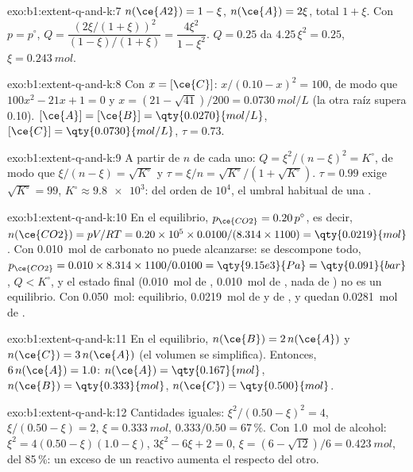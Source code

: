 \begin{solution}{exo:b1:extent-q-and-k:7}
$n(\ce{A2}) = 1 - \xi$, $n(\ce{A}) = 2\xi$, total $1 + \xi$. Con $p =
p^\circ$, $Q = \dfrac{(2\xi/(1+\xi))^2}{(1-\xi)/(1+\xi)} = \dfrac{4\xi^2}{1 -
\xi^2}$. $Q = 0.25$ da $4.25\,\xi^2 = 0.25$, $\xi = \qty{0.243}{mol}$.
\end{solution}

\begin{solution}{exo:b1:extent-q-and-k:8}
Con $x = [\ce{C}]$: $x/(0.10 - x)^2 = 100$, de modo que $100x^2 - 21x + 1 = 0$ y
$x = (21 - \sqrt{41})/200 = \qty{0.0730}{mol/L}$ (la otra raíz supera
0.10). $[\ce{A}] = [\ce{B}] = \qty{0.0270}{mol/L}$, $[\ce{C}] =
\qty{0.0730}{mol/L}$, $\tau = 0.73$.
\end{solution}

\begin{solution}{exo:b1:extent-q-and-k:9}
A partir de $n$ de cada uno: $Q = \xi^2/(n - \xi)^2 = K^\circ$, de modo que $\xi/(n - \xi) =
\sqrt{K^\circ}$ y $\tau = \xi/n = \sqrt{K^\circ}/(1 + \sqrt{K^\circ})$.
$\tau = 0.99$ exige $\sqrt{K^\circ} = 99$, $K^\circ \approx \num{9.8e3}$:
del orden de $10^4$, el umbral habitual de una .
\end{solution}

\begin{solution}{exo:b1:extent-q-and-k:10}
En el equilibrio, $p_{\ce{CO2}} = 0.20\,p^\circ$, es decir, $n(\ce{CO2}) =
pV/RT = 0.20 \times 10^5 \times 0.0100/(8.314 \times 1100) =
\qty{0.0219}{mol}$. Con \qty{0.010}{mol} de carbonato no puede
alcanzarse: se descompone todo, $p_{\ce{CO2}} = 0.010 \times 8.314 \times
1100/0.0100 = \qty{9.15e3}{Pa} = \qty{0.091}{bar}$, $Q < K^\circ$, y el
estado final (\qty{0.010}{mol} de , \qty{0.010}{mol} de ,
nada de ) no es un equilibrio. Con \qty{0.050}{mol}:
equilibrio, \qty{0.0219}{mol} de  y de , y quedan
\qty{0.0281}{mol} de .
\end{solution}

\begin{solution}{exo:b1:extent-q-and-k:11}
En el equilibrio, $n(\ce{B}) = 2\,n(\ce{A})$ y $n(\ce{C}) = 3\,n(\ce{A})$
(el volumen se simplifica). Entonces, $6\,n(\ce{A}) = 1.0$: $n(\ce{A}) =
\qty{0.167}{mol}$, $n(\ce{B}) = \qty{0.333}{mol}$, $n(\ce{C}) =
\qty{0.500}{mol}$.
\end{solution}

\begin{solution}{exo:b1:extent-q-and-k:12}
Cantidades iguales: $\xi^2/(0.50 - \xi)^2 = 4$, $\xi/(0.50 - \xi) = 2$,
$\xi = \qty{0.333}{mol}$,  $0.333/0.50 = 67\,\%$. Con
\qty{1.0}{mol} de alcohol: $\xi^2 = 4(0.50 - \xi)(1.0 - \xi)$,
$3\xi^2 - 6\xi + 2 = 0$,
$\xi = (6 - \sqrt{12})/6 = \qty{0.423}{mol}$,  del 85\,\%: un
exceso de un reactivo aumenta el  respecto del otro.
\end{solution}

